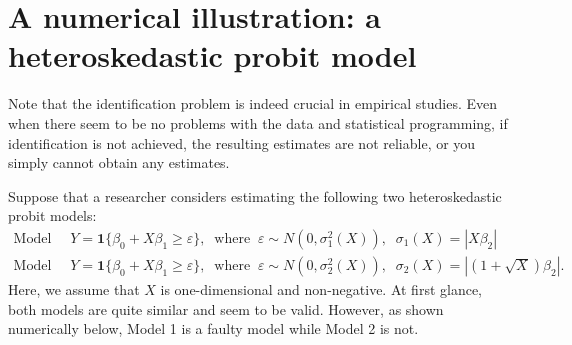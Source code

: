 \documentclass[10.5pt, A4paper, openany, uplatex]{book}
\newcommand{\mbf}{\mathbf}
\newcommand{\eps}{\varepsilon}
\numberwithin{equation}{section}
\begin{document}
\section{A numerical illustration: a heteroskedastic probit model}
Note that the identification problem is indeed crucial in empirical studies.
Even when there seem to be no problems with the data and statistical programming, if identification is not achieved, the resulting estimates are not reliable, or you simply cannot obtain any estimates.

Suppose that a researcher considers estimating the following two heteroskedastic probit models:
\begin{align*}
	\text{Model 1} & \;\; Y = \mbf{1}\{\beta_0 + X \beta_1 \ge \eps\}, \;\; \text{where} \;\; \eps \sim N(0, \sigma^2_1(X)), \;\; \sigma_1(X) = |X\beta_2| \\
	\text{Model 2} & \;\; Y = \mbf{1}\{\beta_0 + X \beta_1 \ge \eps\}, \;\; \text{where} \;\; \eps \sim N(0, \sigma^2_2(X)), \;\; \sigma_2(X) = |(1 + \sqrt{X})\beta_2|.
\end{align*}
Here, we assume that $X$ is one-dimensional and non-negative.
At first glance, both models are quite similar and seem to be valid.
However, as shown numerically below, Model 1 is a faulty model while Model 2 is not.
\end{document}
